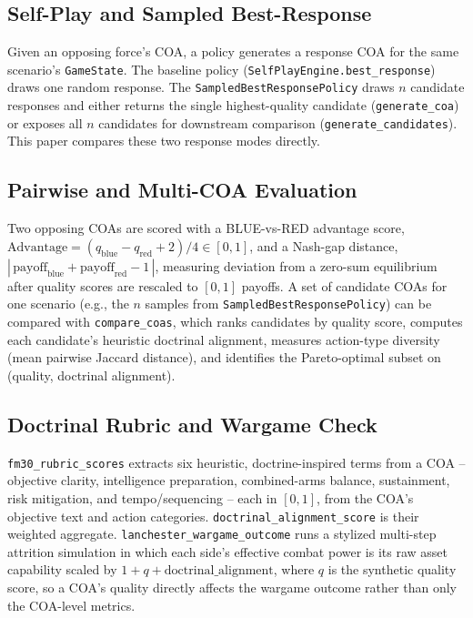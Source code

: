\documentclass[sigconf]{acmart}
\begin{document}
\subsection{Self-Play and Sampled Best-Response}

Given an opposing force's COA, a policy generates a response COA for the same scenario's \texttt{GameState}. The baseline policy (\texttt{SelfPlayEngine.best\_response}) draws one random response. The \texttt{SampledBestResponsePolicy} draws $n$ candidate responses and either returns the single highest-quality candidate (\texttt{generate\_coa}) or exposes all $n$ candidates for downstream comparison (\texttt{generate\_candidates}). This paper compares these two response modes directly.

\subsection{Pairwise and Multi-COA Evaluation}

Two opposing COAs are scored with a BLUE-vs-RED advantage score, $\mathrm{Advantage} = (q_{\mathrm{blue}} - q_{\mathrm{red}} + 2)/4 \in [0,1]$, and a Nash-gap distance, $|\,\mathrm{payoff}_{\mathrm{blue}} + \mathrm{payoff}_{\mathrm{red}} - 1\,|$, measuring deviation from a zero-sum equilibrium after quality scores are rescaled to $[0,1]$ payoffs. A set of candidate COAs for one scenario (e.g., the $n$ samples from \texttt{SampledBestResponsePolicy}) can be compared with \texttt{compare\_coas}, which ranks candidates by quality score, computes each candidate's heuristic doctrinal alignment, measures action-type diversity (mean pairwise Jaccard distance), and identifies the Pareto-optimal subset on (quality, doctrinal alignment).

\subsection{Doctrinal Rubric and Wargame Check}

\texttt{fm30\_rubric\_scores} extracts six heuristic, doctrine-inspired terms from a COA -- objective clarity, intelligence preparation, combined-arms balance, sustainment, risk mitigation, and tempo/sequencing -- each in $[0,1]$, from the COA's objective text and action categories. \texttt{doctrinal\_alignment\_score} is their weighted aggregate. \texttt{lanchester\_wargame\_outcome} runs a stylized multi-step attrition simulation in which each side's effective combat power is its raw asset capability scaled by $1 + q + \mathrm{doctrinal\_alignment}$, where $q$ is the synthetic quality score, so a COA's quality directly affects the wargame outcome rather than only the COA-level metrics.
\end{document}
